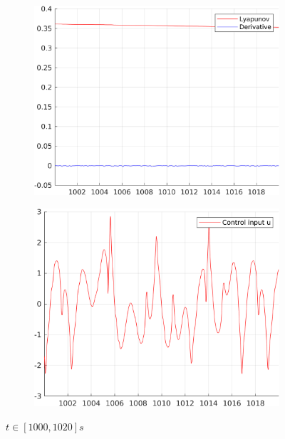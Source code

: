 \documentclass[12pt,a4paper]{article}
\begin{document}
\begin{figure}[H]
\begin{subfigure}{.45\textwidth}
			\includegraphics[width=1\textwidth]{Graphics/NonLinearLyapunov3.png}
		\end{subfigure}%
		\begin{subfigure}{.45\textwidth}
			\centering
			\includegraphics[width=1\textwidth]{Graphics/NonLinearControl3.png}
		\end{subfigure}
		\caption{$t \in [1000,1020]s$}
	\end{figure}
\end{document}
